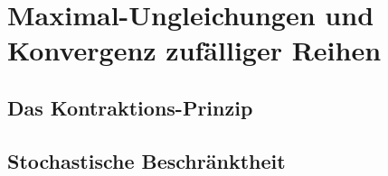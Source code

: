 \chapter{Maximal-Ungleichungen und Konvergenz zufälliger Reihen}



\section{Das Kontraktions-Prinzip}

\section{Stochastische Beschränktheit}
